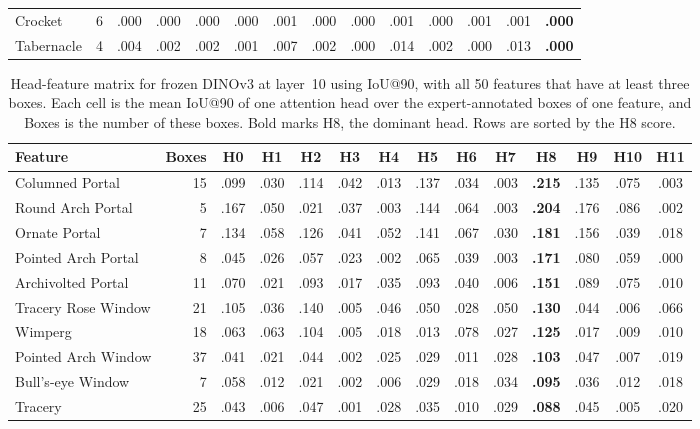 \documentclass[lineno,pdflatex,sn-mathphys-num]{sn-jnl}%
\theoremstyle{thmstyleone}%
\theoremstyle{thmstyletwo}%
\theoremstyle{thmstylethree}%
\begin{document}
\begin{appendices}
\begin{table}[!htbp]
\begin{tabular}{@{}lrcccccccccccc@{}}
Crocket & 6 & .000 & .000 & .000 & .000 & .001 & .000 & .000 & .001 & .000 & .001 & .001 & \textbf{.000} \\
Tabernacle & 4 & .004 & .002 & .002 & .001 & .007 & .002 & .000 & .014 & .002 & .000 & .013 & \textbf{.000} \\
\bottomrule
\end{tabular}
\end{table}

\begin{table}[!htbp]
\centering
\caption{Head-feature matrix for frozen DINOv3 at layer~10 using IoU@90, with all 50 features that have at least three boxes. Each cell is the mean IoU@90 of one attention head over the expert-annotated boxes of one feature, and Boxes is the number of these boxes. Bold marks H8, the dominant head. Rows are sorted by the H8 score.\label{table appendix head feature dinov3}}
\setlength{\tabcolsep}{3pt}
\begin{tabular}{@{}lrcccccccccccc@{}}
\toprule
Feature & Boxes & H0 & H1 & H2 & H3 & H4 & H5 & H6 & H7 & \textbf{H8} & H9 & H10 & H11 \\ \midrule
Columned Portal & 15 & .099 & .030 & .114 & .042 & .013 & .137 & .034 & .003 & \textbf{.215} & .135 & .075 & .003 \\
Round Arch Portal & 5 & .167 & .050 & .021 & .037 & .003 & .144 & .064 & .003 & \textbf{.204} & .176 & .086 & .002 \\
Ornate Portal & 7 & .134 & .058 & .126 & .041 & .052 & .141 & .067 & .030 & \textbf{.181} & .156 & .039 & .018 \\
Pointed Arch Portal & 8 & .045 & .026 & .057 & .023 & .002 & .065 & .039 & .003 & \textbf{.171} & .080 & .059 & .000 \\
Archivolted Portal & 11 & .070 & .021 & .093 & .017 & .035 & .093 & .040 & .006 & \textbf{.151} & .089 & .075 & .010 \\
Tracery Rose Window & 21 & .105 & .036 & .140 & .005 & .046 & .050 & .028 & .050 & \textbf{.130} & .044 & .006 & .066 \\
Wimperg & 18 & .063 & .063 & .104 & .005 & .018 & .013 & .078 & .027 & \textbf{.125} & .017 & .009 & .010 \\
Pointed Arch Window & 37 & .041 & .021 & .044 & .002 & .025 & .029 & .011 & .028 & \textbf{.103} & .047 & .007 & .019 \\
Bull's-eye Window & 7 & .058 & .012 & .021 & .002 & .006 & .029 & .018 & .034 & \textbf{.095} & .036 & .012 & .018 \\
Tracery & 25 & .043 & .006 & .047 & .001 & .028 & .035 & .010 & .029 & \textbf{.088} & .045 & .005 & .020 \\

\end{tabular}
\end{table}
\end{appendices}
\end{document}
